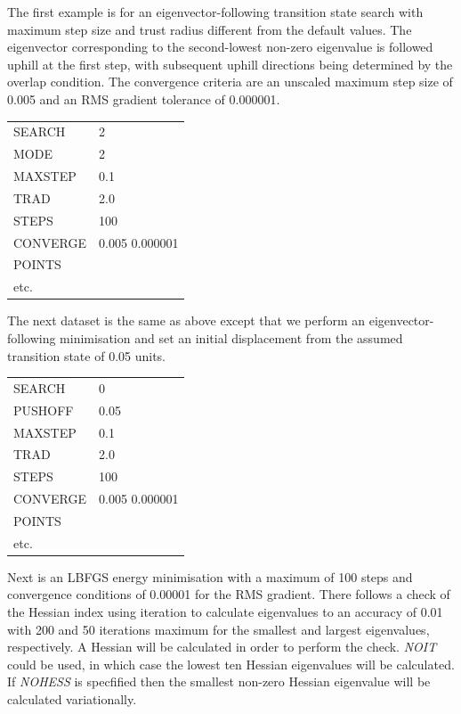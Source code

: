 \documentclass[12pt,a4paper,dvips]{article}
\begin{document}
The first example is for an eigenvector-following 
transition state search with maximum step size and  trust radius different from the default
values. The eigenvector corresponding to the second-lowest non-zero eigenvalue is followed
uphill at the first step, with subsequent uphill directions being determined by the overlap
condition. The convergence criteria are an unscaled maximum step size of 0.005 and an RMS
gradient tolerance of 0.000001. 

\medskip
\begin{tabular}{ll}
 SEARCH & 2  \\
 MODE & 2 \\
 MAXSTEP & 0.1  \\
 TRAD & 2.0  \\
 STEPS & 100  \\
 CONVERGE & 0.005 0.000001  \\
 POINTS  \\
 etc.  \\
\end{tabular}
\medskip

\noindent The next dataset is the same as above except that we perform an eigenvector-following
minimisation and set an initial displacement from the assumed transition state of
0.05 units.

\medskip
\begin{tabular}{ll}
 SEARCH & 0 \\
 PUSHOFF & 0.05 \\
 MAXSTEP & 0.1 \\
 TRAD & 2.0 \\
 STEPS & 100 \\
 CONVERGE & 0.005 0.000001 \\
 POINTS \\
 etc. \\
\end{tabular}
\medskip

\noindent Next is an LBFGS energy minimisation with a maximum of 100 steps and
convergence conditions of 0.00001 for the RMS gradient.
There follows a check of the Hessian index using iteration to calculate 
eigenvalues to an accuracy of 0.01 with 200 and 50 iterations maximum for the smallest
and largest eigenvalues, respectively. A Hessian will be calculated in order to 
perform the check. {\it NOIT\/} could be used, in which case the lowest ten Hessian
eigenvalues will be calculated. If {\it NOHESS\/} is specfified then the smallest
non-zero Hessian eigenvalue will be calculated variationally.
\end{document}
